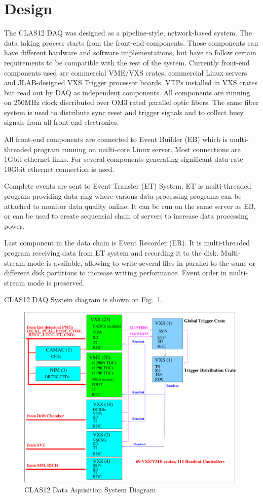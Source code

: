 \section{Design}

The CLAS12 DAQ was designed as a pipeline-style, network-based system. The data taking process starts from the front-end components. Those components can have different hardware and software implementations, but have to follow certain requirements to be compatible with the rest of the system. Currently front-end components used are commercial VME/VXS crates, commercial Linux servers and JLAB-designed VXS Trigger processor boards. VTPs installed in VXS crates but read out by DAQ as independent components. All components are running on 250MHz clock discributed over OM3 rated parallel optic fibers. The same fiber system is used to distribute sync reset and trigger signals and to collect busy signals from all front-end electronics.

All front-end components are connected to Event Builder (EB) which is multi-threaded program running on multi-core Linux server. Most connections are 1Gbit ethernet links. For several components generating significant data rate 10Gbit ethernet connection is used.

Complete events are sent to Event Transfer (ET) System. ET is multi-threaded program providing data ring where various data processing programs can be attached to monitor data quality online. It can be run on the same server as EB, or can be used to create sequensial chain of servers to increase data processing power.

Last component in the data chain is Event Recorder (ER). It is multi-threaded program receiving data from ET system and recording it to the disk. Multi-stream mode is available, allowing to write several files in parallel to the same or different disk partitions to increase writing performance. Event order in multi-stream mode is preserved.

CLAS12 DAQ System diagram is shown on Fig.~\ref{fig:DAQdiagram}.

\begin{figure}[hbt]
	\centering
	\includegraphics[width=1.0\columnwidth,keepaspectratio]{img/CLAS12_HARDWARE_2.pdf}
	\caption{CLAS12 Data Aquisition System Diagram}
	\label{fig:DAQdiagram}
\end{figure}

